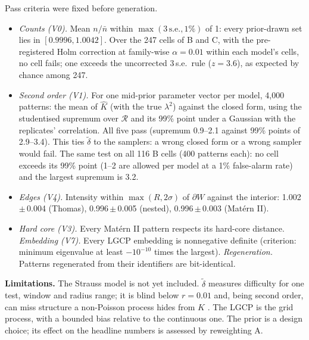 \documentclass[10pt,a4paper]{article}
\newcommand{\nbar}{\bar n}
\newcommand{\dtil}{\tilde\delta}
\newcommand{\R}{\mathcal{R}}
\begin{document}
Pass criteria were fixed before generation.
\begin{itemize}
  \item \emph{Counts (V0).} Mean $n/\nbar$ within $\max(3\,\text{s.e.},1\%)$ of 1: every prior-drawn set lies in $[0.9996,1.0042]$. Over the 247 cells of B and C, with the pre-registered Holm correction at family-wise $\alpha=0.01$ within each model's cells, no cell fails; one exceeds the uncorrected 3\,s.e.\ rule ($z=3.6$), as expected by chance among 247.
  \item \emph{Second order (V1).} For one mid-prior parameter vector per model, 4{,}000 patterns: the mean of $\hat K$ (with the true $\lambda^2$) against the closed form, using the studentised supremum over $\R$ and its 99\% point under a Gaussian with the replicates' correlation. All five pass (supremum 0.9--2.1 against 99\% points of 2.9--3.4). This ties $\dtil$ to the samplers: a wrong closed form or a wrong sampler would fail. The same test on all 116 B cells (400 patterns each): no cell exceeds its 99\% point (1--2 are allowed per model at a 1\% false-alarm rate) and the largest supremum is 3.2.
  \item \emph{Edges (V4).} Intensity within $\max(R,2\sigma)$ of $\partial W$ against the interior: 1.002\,$\pm$\,0.004 (Thomas), 0.996\,$\pm$\,0.005 (nested), 0.996\,$\pm$\,0.003 (Mat\'ern II).
  \item \emph{Hard core (V3).} Every Mat\'ern II pattern respects its hard-core distance. \emph{Embedding (V7).} Every LGCP embedding is nonnegative definite (criterion: minimum eigenvalue at least $-10^{-10}$ times the largest). \emph{Regeneration.} Patterns regenerated from their identifiers are bit-identical.
\end{itemize}

\textbf{Limitations.} The Strauss model is not yet included. $\dtil$ measures difficulty for one test, window and radius range; it is blind below $r=0.01$ and, being second order, can miss structure a non-Poisson process hides from $K$ \citep{BaddeleySilverman1984}. The LGCP is the grid process, with a bounded bias relative to the continuous one. The prior is a design choice; its effect on the headline numbers is assessed by reweighting A.



\end{document}
